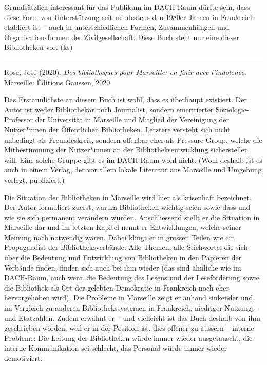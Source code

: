 \documentclass[a4paper,
fontsize=11pt,
oneside,
numbers=noperiodatend,
parskip=half-,
bibliography=totoc,
final
]{scrartcl}
\begin{document}
Grundsätzlich interessant für das Publikum im DACH-Raum dürfte sein,
dass diese Form von Unterstützung seit mindestens den 1980er Jahren in
Frankreich etabliert ist -- auch in unterschiedlichen Formen,
Zusammenhängen und Organisationsformen der Zivilgesellschaft. Diese Buch
stellt nur eine dieser Bibliotheken vor. (ks)

\begin{center}\rule{0.5\linewidth}{0.5pt}\end{center}

Rose, José (2020). \emph{Des bibliothèques pour Marseille: en finir avec
l'indolence}. Marseille: Éditions Gaussen, 2020

Das Erstaunlichste an diesem Buch ist wohl, dass es überhaupt existiert.
Der Autor ist weder Bibliothekar noch Journalist, sondern emeritierter
Soziologie-Professor der Universität in Marseille und Mitglied der
Vereinigung der Nutzer*innen der Öffentlichen Bibliotheken. Letztere
versteht sich nicht unbedingt als Freundeskreis, sondern offenbar eher
als Pressure-Group, welche die Mitbestimmung der Nutzer*innen an der
Bibliotheksentwicklung sicherstellen will. Eine solche Gruppe gibt es im
DACH-Raum wohl nicht. (Wohl deshalb ist es auch in einem Verlag, der vor
allem lokale Literatur aus Marseille und Umgebung verlegt, publiziert.)

Die Situation der Bibliotheken in Marseille wird hier als krisenhaft
bezeichnet. Der Autor formuliert zuerst, warum Bibliotheken wichtig
seien sowie dass und wie sie sich permanent verändern würden.
Anschliessend stellt er die Situation in Marseille dar und im letzten
Kapitel nennt er Entwicklungen, welche seiner Meinung nach notwendig
wären. Dabei klingt er in grossen Teilen wie ein Propagandist der
Bibliotheksverbände: Alle Themen, alle Stichworte, die sich über die
Bedeutung und Entwicklung von Bibliotheken in den Papieren der Verbände
finden, finden sich auch bei ihm wieder (das sind ähnliche wie im
DACH-Raum, auch wenn die Bedeutung des Lesens und der Leseförderung
sowie die Bibliothek als Ort der gelebten Demokratie in Frankreich noch
eher hervorgehoben wird). Die Probleme in Marseille zeigt er anhand
sinkender und, im Vergleich zu anderen Bibliothekssystemen in
Frankreich, niedriger Nutzungs- und Etatzahlen. Zudem erwähnt er -- und
vielleicht ist das Buch deshalb von ihm geschrieben worden, weil er in
der Position ist, dies offener zu äussern -- interne Probleme: Die
Leitung der Bibliotheken würde immer wieder ausgetauscht, die interne
Kommunikation sei schlecht, das Personal würde immer wieder demotiviert.
\end{document}
